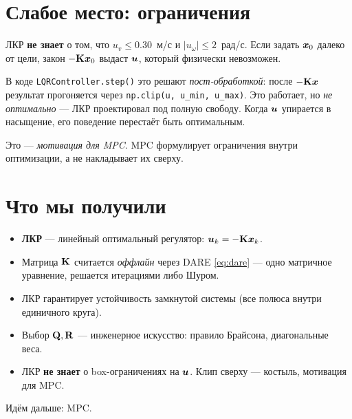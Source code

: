 \section{Слабое место: ограничения}

ЛКР \textbf{не знает} о том, что $u_v \le 0.30$~м/с и $|u_\omega| \le
2$~рад/с. Если задать $\bm{x}_0$ далеко от цели, закон $-\mathbf{K}\bm{x}_0$
выдаст $\bm{u}$, который физически невозможен.

\begin{warnbox}
В коде \texttt{LQRController.step()} это решают \emph{пост-обработкой}:
после $-\mathbf{K}\bm{x}$ результат прогоняется через
\texttt{np.clip(u, u\_min, u\_max)}. Это работает, но \emph{не оптимально}
--- ЛКР проектировал под полную свободу. Когда $\bm{u}$ упирается в
насыщение, его поведение перестаёт быть оптимальным.

Это --- \emph{мотивация для MPC}. MPC формулирует ограничения внутри
оптимизации, а не накладывает их сверху.
\end{warnbox}

\section{Что мы получили}

\begin{itemize}
  \item \textbf{ЛКР} --- линейный оптимальный регулятор:
        $\bm{u}_k = -\mathbf{K}\bm{x}_k$.
  \item Матрица $\mathbf{K}$ считается \emph{оффлайн} через DARE
        \eqref{eq:dare} --- одно матричное уравнение, решается итерациями
        либо Шуром.
  \item ЛКР гарантирует устойчивость замкнутой системы (все полюса
        внутри единичного круга).
  \item Выбор $\mathbf{Q}, \mathbf{R}$ --- инженерное искусство: правило
        Брайсона, диагональные веса.
  \item ЛКР \textbf{не знает} о box-ограничениях на $\bm{u}$. Клип
        сверху --- костыль, мотивация для MPC.
\end{itemize}

Идём дальше: MPC.
